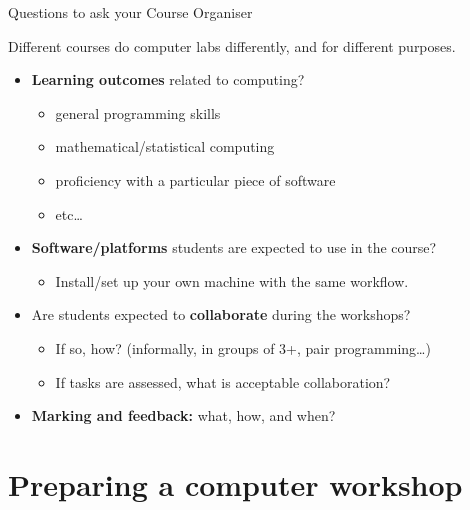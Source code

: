 \documentclass[10pt]{beamer}
\begin{document}
\begin{frame}[fragile]{Questions to ask your Course Organiser}

    Different courses do computer labs differently, and for different purposes.
    \pause

    \begin{itemize}[<+->]
        \item \textbf{Learning outcomes} related to computing?
            \begin{itemize}
                \item general programming skills
                \item mathematical/statistical computing
                \item proficiency with a particular piece of software
                \item etc\ldots
            \end{itemize}
        \item \textbf{Software/platforms} students are expected to use in the course?
            \begin{itemize}
                \item Install/set up your own machine with the same workflow.
            \end{itemize}
        \item Are students expected to \textbf{collaborate} during the workshops?
            \begin{itemize}
                \item If so, how? (informally, in groups of 3+, pair programming\ldots)
                \item If tasks are assessed, what is acceptable collaboration?
            \end{itemize}
        \item \textbf{Marking and feedback:} what, how, and when?
    \end{itemize}

  
\end{frame}

\section{Preparing a computer workshop}
\end{document}
